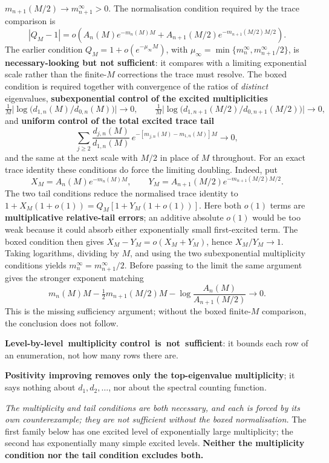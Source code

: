 \documentclass[11pt]{article}
\begin{document}
\begin{itemize}
$m_{n+1}(M/2)\to m_{n+1}^\infty>0$.  The normalisation condition required by the
trace comparison is
\[
 \boxed{\ |Q_M-1|=o\!\left(
 A_n(M)e^{-m_n(M)M}
 +A_{n+1}(M/2)e^{-m_{n+1}(M/2)M/2}\right).\ }
\]
The earlier condition $Q_M=1+o(e^{-\mu_\infty M})$, with
$\mu_\infty=\min\{m_n^\infty,m_{n+1}^\infty/2\}$, is \textbf{necessary-looking but
not sufficient}: it compares with a limiting exponential scale rather than the
finite-$M$ corrections the trace must resolve.  The boxed condition is required
together with convergence of the ratios of \emph{distinct} eigenvalues,
\textbf{subexponential control of the excited multiplicities}
\[
\tfrac1M\bigl|\log\bigl(d_{1,n}(M)/d_{0,n}(M)\bigr)\bigr|\to0,
\qquad
\tfrac1M\bigl|\log\bigl(d_{1,n+1}(M/2)/d_{0,n+1}(M/2)\bigr)\bigr|\to0,
\]
and \textbf{uniform control of the total excited trace tail}
\[
\sum_{j\ge2}\frac{d_{j,n}(M)}{d_{1,n}(M)}
\,e^{-[m_{j,n}(M)-m_{1,n}(M)]M}\longrightarrow0 ,
\]
and the same at the next scale with $M/2$ in place of $M$ throughout.
For an exact trace identity these conditions do force the limiting doubling.  Indeed,
put
\[
 X_M=A_n(M)e^{-m_n(M)M},\qquad
 Y_M=A_{n+1}(M/2)e^{-m_{n+1}(M/2)M/2}.
\]
The two tail conditions reduce the normalised trace identity to
$1+X_M(1+o(1))=Q_M[1+Y_M(1+o(1))]$.  Here both $o(1)$ terms are
\textbf{multiplicative relative-tail errors}; an additive absolute $o(1)$ would be
too weak because it could absorb either exponentially small first-excited term.  The
boxed condition then gives
$X_M-Y_M=o(X_M+Y_M)$, hence $X_M/Y_M\to1$.  Taking logarithms, dividing by $M$,
and using the two subexponential multiplicity conditions yields
$m_n^\infty=m_{n+1}^\infty/2$.  Before passing to the limit the same argument gives
the stronger exponent matching
\[
 m_n(M)M-\tfrac12m_{n+1}(M/2)M-\log\!\frac{A_n(M)}{A_{n+1}(M/2)}\longrightarrow0.
\]
This is the missing sufficiency argument; without the boxed finite-$M$ comparison,
the conclusion does not follow.
{\sloppy \textbf{\mbox{Level-by-level multiplicity} \mbox{control is not sufficient}}: it bounds each row of an enumeration, not how
many rows there are.\par}
\textbf{Positivity improving removes only the \mbox{top-eigenvalue}
multiplicity}; it says nothing about $d_1,d_2,\dots$, nor about the spectral counting
function.

\emph{The multiplicity and tail conditions are both necessary, and each is forced by
its own counterexample; they are not sufficient without the boxed normalisation.} The
first family below has one excited level of exponentially large multiplicity; the second
has exponentially many simple excited levels. \textbf{Neither the multiplicity condition
nor the tail condition excludes both.}


\end{itemize}
\end{document}
